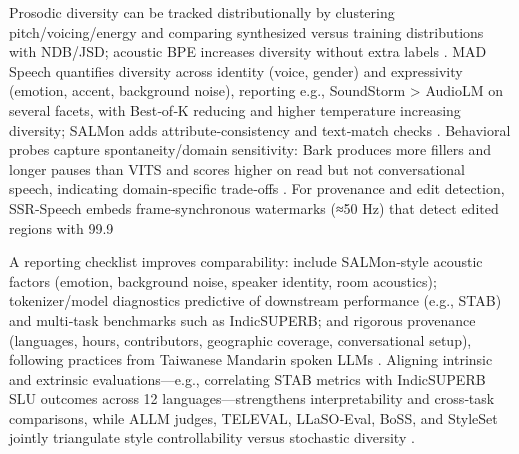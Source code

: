 \documentclass{article}
\begin{document}
Prosodic diversity can be tracked distributionally by clustering pitch/voicing/energy and comparing synthesized versus training distributions with NDB/JSD; acoustic BPE increases diversity without extra labels \cite{li2024effectivenessacousticbpedecoderonlytts}. MAD Speech quantifies diversity across identity (voice, gender) and expressivity (emotion, accent, background noise), reporting e.g., SoundStorm > AudioLM on several facets, with Best‑of‑K reducing and higher temperature increasing diversity; SALMon adds attribute‑consistency and text‑match checks \cite{futeral2025madspeechmeasuresacousticdiversity,maimon2025salmonsuiteacousticlanguagemodelevaluati}. Behavioral probes capture spontaneity/domain sensitivity: Bark produces more fillers and longer pauses than VITS and scores higher on read but not conversational speech, indicating domain‑specific trade‑offs \cite{wang2024evaluatingtextspeechsynthesislargediscre}. For provenance and edit detection, SSR‑Speech embeds frame‑synchronous watermarks (≈50 Hz) that detect edited regions with 99.9%

A reporting checklist improves comparability: include SALMon‑style acoustic factors (emotion, background noise, speaker identity, room acoustics); tokenizer/model diagnostics predictive of downstream performance (e.g., STAB) and multi‑task benchmarks such as IndicSUPERB; and rigorous provenance (languages, hours, contributors, geographic coverage, conversational setup), following practices from Taiwanese Mandarin spoken LLMs \cite{maimon2025salmonsuiteacousticlanguagemodelevaluati,vashishth2024stabspeechtokenizerassessmentbenchmark,entry2025indicsuperbspeechprocessinguniversalperf,yang2024buildingtaiwanesemandarinspokenlanguagem}. Aligning intrinsic and extrinsic evaluations—e.g., correlating STAB metrics with IndicSUPERB SLU outcomes across 12 languages—strengthens interpretability and cross‑task comparisons, while ALLM judges, TELEVAL, LLaSO‑Eval, BoSS, and StyleSet jointly triangulate style controllability versus stochastic diversity \cite{vashishth2024stabspeechtokenizerassessmentbenchmark,entry2025indicsuperbspeechprocessinguniversalperf,chiang2025audioawarelargelanguagemodelsasjudgesspe,li2025televaldynamicbenchmarkdesignedspokenlan,sun2025llasofoundationalframeworkreproduciblere,wang2025bossbeyondsemanticspeech}.
\end{document}
